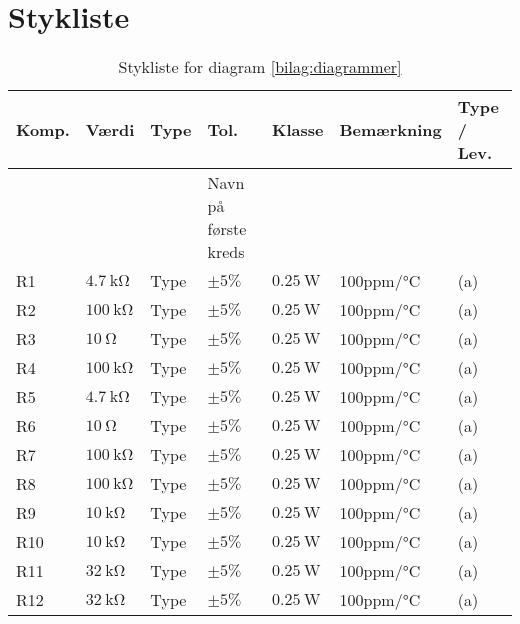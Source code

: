 \chapter{Stykliste} \label{bilag:styklister}

\begin{table}[h!]
\small
\caption{Stykliste for diagram \ref{bilag:diagrammer}}
\label{tab:styklister}
\begin{threeparttable}
\begin{tabular}{ l l l l l l l }
\toprule
\multicolumn{1}{l}{\textbf{Komp.}}       &
\multicolumn{1}{l}{\textbf{Værdi}}       &
\multicolumn{1}{l}{\textbf{Type}}       &
\multicolumn{1}{l}{\textbf{Tol.}} &
\multicolumn{1}{l}{\textbf{Klasse}} &
\multicolumn{1}{l}{\textbf{Bemærkning}} &
\multicolumn{1}{l}{\textbf{Type / Lev.}}  \\ 
\hline
& & & Navn på første kreds & & & \\
R1 & $\SI{4.7}{\kilo\ohm}$			& Type	& $\pm 5\%$ 		 & $\SI{0.25}{\watt}$	  & 100ppm/\si{\celsius}  & (a) \\
R2 & $\SI{100}{\kilo\ohm}$			& Type	& $\pm 5\%$ 		 & $\SI{0.25}{\watt}$	  & 100ppm/\si{\celsius}  & (a) \\
R3 & $\SI{10}{\ohm}$			& Type	& $\pm 5\%$ 		 & $\SI{0.25}{\watt}$	  & 100ppm/\si{\celsius}  & (a) \\
R4 & $\SI{100}{\kilo\ohm}$			& Type	& $\pm 5\%$ 		 & $\SI{0.25}{\watt}$	  & 100ppm/\si{\celsius}  & (a) \\
R5 & $\SI{4.7}{\kilo\ohm}$			& Type	& $\pm 5\%$ 		 & $\SI{0.25}{\watt}$	  & 100ppm/\si{\celsius}  & (a) \\
R6 & $\SI{10}{\ohm}$			& Type	& $\pm 5\%$ 		 & $\SI{0.25}{\watt}$	  & 100ppm/\si{\celsius}  & (a) \\
R7 & $\SI{100}{\kilo\ohm}$			& Type	& $\pm 5\%$ 		 & $\SI{0.25}{\watt}$	  & 100ppm/\si{\celsius}  & (a) \\
R8 & $\SI{100}{\kilo\ohm}$			& Type	& $\pm 5\%$ 		 & $\SI{0.25}{\watt}$	  & 100ppm/\si{\celsius}  & (a) \\
R9 & $\SI{10}{\kilo\ohm}$			& Type	& $\pm 5\%$ 		 & $\SI{0.25}{\watt}$	  & 100ppm/\si{\celsius}  & (a) \\
R10 & $\SI{10}{\kilo\ohm}$			& Type	& $\pm 5\%$ 		 & $\SI{0.25}{\watt}$	  & 100ppm/\si{\celsius}  & (a) \\
R11 & $\SI{32}{\kilo\ohm}$			& Type	& $\pm 5\%$ 		 & $\SI{0.25}{\watt}$	  & 100ppm/\si{\celsius}  & (a) \\
R12 & $\SI{32}{\kilo\ohm}$			& Type	& $\pm 5\%$ 		 & $\SI{0.25}{\watt}$	  & 100ppm/\si{\celsius}  & (a) \\

\end{tabular}
\end{threeparttable}
\end{table}
